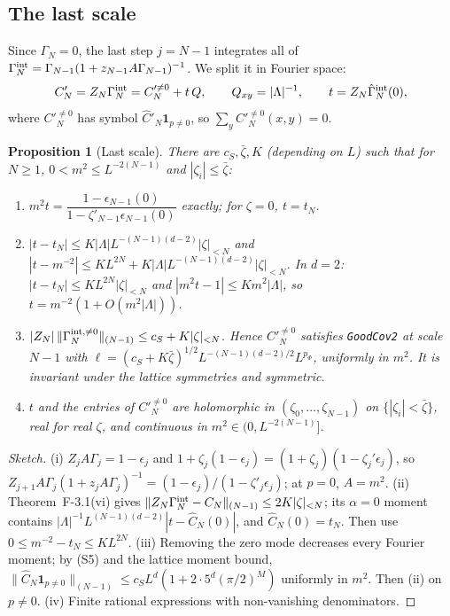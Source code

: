 \documentclass[11pt]{amsart}
\newtheorem{proposition}[theorem]{Proposition}
\theoremstyle{definition}
\theoremstyle{remark}
\numberwithin{equation}{section}
\begin{document}
\subsection{The last scale}
Since $\Gamma_N=0$, the last step $j=N-1$ integrates all of
$\Gamma^{\rm int}_N=\Gamma_{N-1}(1+z_{N-1}A\Gamma_{N-1})^{-1}$. We split it in Fourier space:
\[
  C'_N=Z_N\Gamma^{\rm int}_N=C'^{\ne0}_N+t\,Q,\qquad Q_{xy}=|\Lambda|^{-1},\qquad
  t=Z_N\hat\Gamma^{\rm int}_N(0),
\]
where $C'^{\ne0}_N$ has symbol $\hat C'_N\mathbf 1_{p\ne0}$, so $\sum_yC'^{\ne0}_N(x,y)=0$.
\begin{proposition}[Last scale]\label{prop:last}
There are $c_S,\bar\zeta,K$ (depending on $L$) such that for $N\ge1$, $0<m^2\le L^{-2(N-1)}$
and $|\zeta_i|\le\bar\zeta$:
\begin{enumerate}[label=(\roman*)]
\item $m^2t=\dfrac{1-\epsilon_{N-1}(0)}{1-\zeta'_{N-1}\epsilon_{N-1}(0)}$ exactly; for $\zeta=0$,
  $t=t_N$.
\item $|t-t_N|\le K|\Lambda|L^{-(N-1)(d-2)}|\zeta|_{<N}$ and
  $|t-m^{-2}|\le KL^{2N}+K|\Lambda|L^{-(N-1)(d-2)}|\zeta|_{<N}$. In $d=2$:
  $|t-t_N|\le KL^{2N}|\zeta|_{<N}$ and $|m^2t-1|\le Km^2|\Lambda|$, so
  $t=m^{-2}(1+O(m^2|\Lambda|))$.
\item $|Z_N|\,\|\Gamma^{{\rm int},\ne0}_N\|_{(N-1)}\le c_S+K|\zeta|_{<N}$. Hence
  $C'^{\ne0}_N$ satisfies \texttt{GoodCov2} at scale $N-1$ with
  $\ell=(c_S+K\bar\zeta)^{1/2}L^{-(N-1)(d-2)/2}L^{p_\Phi}$, uniformly in $m^2$. It is
  invariant under the lattice symmetries and symmetric.
\item $t$ and the entries of $C'^{\ne0}_N$ are holomorphic in $(\zeta_0,\dots,\zeta_{N-1})$ on
  $\{|\zeta_i|<\bar\zeta\}$, real for real $\zeta$, and continuous in $m^2\in(0,L^{-2(N-1)}]$.
\end{enumerate}
\end{proposition}
\begin{proof}[Sketch]
(i) $Z_jA\Gamma_j=1-\epsilon_j$ and $1+\zeta_j(1-\epsilon_j)=(1+\zeta_j)(1-\zeta_j'\epsilon_j)$, so
$Z_{j+1}A\Gamma_j(1+z_jA\Gamma_j)^{-1}=(1-\epsilon_j)/(1-\zeta'_j\epsilon_j)$; at $p=0$, $A=m^2$.
(ii) Theorem~F-3.1(vi) gives $\|Z_N\Gamma^{\rm int}_N-C_N\|_{(N-1)}\le2K|\zeta|_{<N}$; its $\alpha=0$
moment contains $|\Lambda|^{-1}L^{(N-1)(d-2)}|t-\hat C_N(0)|$, and $\hat C_N(0)=t_N$. Then use
$0\le m^{-2}-t_N\le KL^{2N}$.
(iii) Removing the zero mode decreases every Fourier moment; by (S5) and the lattice moment bound,
$\|\hat C_N\mathbf 1_{p\ne0}\|_{(N-1)}\le c_SL^d(1+2\cdot5^d(\pi/2)^M)$ uniformly in $m^2$. Then (ii)
on $p\ne0$.
(iv) Finite rational expressions with non-vanishing denominators.
\end{proof}
\end{document}
